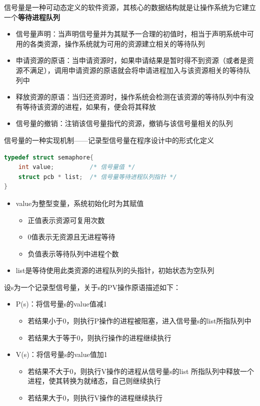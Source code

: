 \documentclass[cs4size,a4paper,10pt]{ctexart}
\begin{document}
	信号量是一种可动态定义的软件资源，其核心的数据结构就是让操作系统为它建立一个\textbf{等待进程队列}\begin{itemize}
		\item 信号量声明：当声明信号量并为其赋予一合理的初值时，相当于声明系统中可用的各类资源，操作系统就为可用的资源建立相关的等待队列
		\item 申请资源的原语：当申请资源时，如果申请结果是暂时得不到资源（或者是资源不满足），调用申请资源的原语就会将申请进程加入与该资源相关的等待队列中
		\item 释放资源的原语：当归还资源时，操作系统会检测在该资源的等待队列中有没有等待该资源的进程，如果有，便会将其释放
		\item 信号量的撤销：注销该信号量指代的资源，撤销与该信号量相关的队列
	\end{itemize}

	信号量的一种实现机制——记录型信号量在程序设计中的形式化定义
	\begin{lstlisting}[language=C,keywordstyle=\color{black}]
typedef struct semaphore{
	int value;			/* 信号量值 */
	struct pcb * list;	/* 信号量等待进程队列指针 */
}
	\end{lstlisting}
	\begin{itemize}
		\item value为整型变量，系统初始化时为其赋值
		\begin{itemize}
			\item 正值表示资源可复用次数
			\item 0值表示无资源且无进程等待
			\item 负值表示等待队列中进程个数
		\end{itemize}
		\item list是等待使用此类资源的进程队列的头指针，初始状态为空队列
	\end{itemize}

	设s为一个记录型信号量，关于s的PV操作原语描述如下：
	\begin{itemize}
		\item P(s)：将信号量s的value值减1
		\begin{itemize}
			\item 若结果小于0，则执行P操作的进程被阻塞，进入信号量s的list所指队列中
			\item 若结果大于等于0，则执行操作的进程继续执行
		\end{itemize}
		\item V(s)：将信号量s的value值加1
		\begin{itemize}
			\item 若结果不大于0，则执行V操作的进程从信号量s的list 所指队列中释放一个进程，使其转换为就绪态，自己则继续执行
			\item 若结果大于0，则执行V操作的进程继续执行
		\end{itemize}
	\end{itemize}
\end{document}
